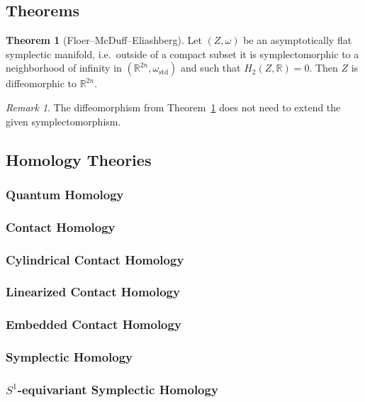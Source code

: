 \documentclass[a4paper]{article}
\newcommand{\RR}{\mathbb{R}}
\theoremstyle{definition}
\newtheorem{thm}{Theorem}
\theoremstyle{definition}
\theoremstyle{remark}
\newtheorem{rmk}{Remark}
\theoremstyle{remark}
\theoremstyle{remark}
\begin{document}
\subsection{Theorems}

\begin{thm}[Floer--McDuff--Eliashberg]
  Let $(Z,\omega)$ be an asymptotically flat symplectic manifold, i.e.\ outside of a compact subset it is symplectomorphic to a neighborhood of infinity in $(\RR^{2n},\omega_{\text{std}})$ and such that $H_2(Z,\RR)=0$. Then $Z$ is diffeomorphic to $\RR^{2n}$.
\label{thm:fme}
\end{thm}

\begin{rmk}
  The diffeomorphism from Theorem~\ref{thm:fme} does not need to extend the given symplectomorphism.
\end{rmk}

\subsection{Homology Theories}

\subsubsection{Quantum Homology}

\subsubsection{Contact Homology}

\subsubsection{Cylindrical Contact Homology}

\subsubsection{Linearized Contact Homology}

\subsubsection{Embedded Contact Homology}

\subsubsection{Symplectic Homology}

\subsubsection{$S^1$-equivariant Symplectic Homology}
\end{document}
